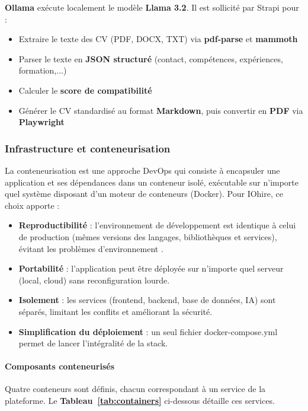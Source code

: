 \documentclass[12pt,a4paper,oneside]{report}
\begin{document}
\begin{itemize}
\textbf{Ollama} exécute localement le modèle \textbf{Llama 3.2}. Il est sollicité par Strapi pour :

\begin{itemize}
    \item Extraire le texte des CV (PDF, DOCX, TXT) via \textbf{pdf-parse} et \textbf{mammoth}
    \item Parser le texte en \textbf{JSON structuré} (contact, compétences, expériences, formation,...)
    \item Calculer le \textbf{score de compatibilité}
    \item Générer le CV standardisé au format \textbf{Markdown}, puis convertir en \textbf{PDF} via \textbf{Playwright}
\end{itemize}


\subsubsection{Infrastructure et conteneurisation}
\label{sec:docker}

La conteneurisation est une approche DevOps qui consiste à encapsuler une application et ses dépendances dans un conteneur isolé, exécutable sur n’importe quel système disposant d’un moteur de conteneurs (Docker). Pour IOhire, ce choix apporte :

\begin{itemize}
    \item \textbf{Reproductibilité} : l’environnement de développement est identique à celui de production (mêmes versions des langages, bibliothèques et services), évitant les problèmes d’environnement .
    \item \textbf{Portabilité} : l’application peut être déployée sur n’importe quel serveur (local, cloud) sans reconfiguration lourde.
    \item \textbf{Isolement} : les services (frontend, backend, base de données, IA) sont séparés, limitant les conflits et améliorant la sécurité.
    \item \textbf{Simplification du déploiement} : un seul fichier docker-compose.yml permet de lancer l’intégralité de la stack.
\end{itemize}

\paragraph{Composants conteneurisés}
Quatre conteneurs sont définis, chacun correspondant à un service de la plateforme. Le \textbf{Tableau~\ref{tab:containers}} ci-dessous détaille ces services.


\end{itemize}
\end{document}
